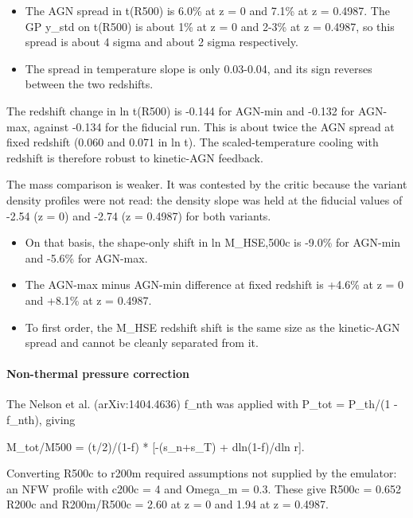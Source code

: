 \documentclass[11pt,a4paper]{article}
\begin{document}
\begin{itemize}
  \item The AGN spread in t(R500) is 6.0\% at z = 0 and 7.1\% at z = 0.4987. The GP y\_std on t(R500) is about 1\% at z = 0 and 2-3\% at z = 0.4987, so this spread is about 4 sigma and about 2 sigma respectively.
  \item The spread in temperature slope is only 0.03-0.04, and its sign reverses between the two redshifts.
\end{itemize}
The redshift change in ln t(R500) is -0.144 for AGN-min and -0.132 for AGN-max, against -0.134 for the fiducial run. This is about twice the AGN spread at fixed redshift (0.060 and 0.071 in ln t). The scaled-temperature cooling with redshift is therefore robust to kinetic-AGN feedback.

The mass comparison is weaker. It was contested by the critic because the variant density profiles were not read: the density slope was held at the fiducial values of -2.54 (z = 0) and -2.74 (z = 0.4987) for both variants.

\begin{itemize}
  \item On that basis, the shape-only shift in ln M\_HSE,500c is -9.0\% for AGN-min and -5.6\% for AGN-max.
  \item The AGN-max minus AGN-min difference at fixed redshift is +4.6\% at z = 0 and +8.1\% at z = 0.4987.
  \item To first order, the M\_HSE redshift shift is the same size as the kinetic-AGN spread and cannot be cleanly separated from it.
\end{itemize}
\paragraph{Non-thermal pressure correction}
The Nelson et al. (arXiv:1404.4636) f\_nth was applied with P\_tot = P\_th/(1 - f\_nth), giving

M\_tot/M500 = (t/2)/(1-f) * [-(s\_n+s\_T) + dln(1-f)/dln r].

Converting R500c to r200m required assumptions not supplied by the emulator: an NFW profile with c200c = 4 and Omega\_m = 0.3. These give R500c = 0.652 R200c and R200m/R500c = 2.60 at z = 0 and 1.94 at z = 0.4987.
\end{document}
